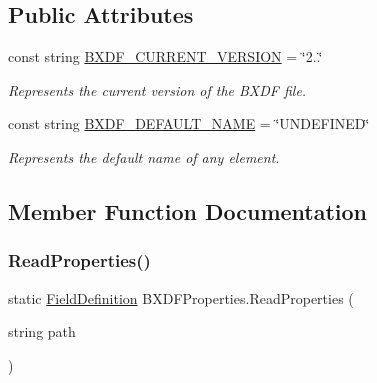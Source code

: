 \subsection*{Public Attributes}
\begin{DoxyCompactItemize}
\item 
const string \hyperlink{class_b_x_d_f_properties_a3a3fb8d9965ad93678223400a278fd47}{B\+X\+D\+F\+\_\+\+C\+U\+R\+R\+E\+N\+T\+\_\+\+V\+E\+R\+S\+I\+ON} = \char`\"{}2..\char`\"{}
\begin{DoxyCompactList}\small\item\em Represents the current version of the B\+X\+DF file. \end{DoxyCompactList}\item 
const string \hyperlink{class_b_x_d_f_properties_a528bb431080585f72f9f74bd44a23932}{B\+X\+D\+F\+\_\+\+D\+E\+F\+A\+U\+L\+T\+\_\+\+N\+A\+ME} = \char`\"{}U\+N\+D\+E\+F\+I\+N\+ED\char`\"{}
\begin{DoxyCompactList}\small\item\em Represents the default name of any element. \end{DoxyCompactList}\end{DoxyCompactItemize}


\subsection{Member Function Documentation}
\mbox{\label{class_b_x_d_f_properties_aaccec6c74c63d681230c9b08a1e8c4ea}} 
\subsubsection{\texorpdfstring{Read\+Properties()}{ReadProperties()}\hspace{0.1cm}{\footnotesize\ttfamily [1/2]}}
{\footnotesize\ttfamily static \hyperlink{class_field_definition}{Field\+Definition} B\+X\+D\+F\+Properties.\+Read\+Properties (\begin{DoxyParamCaption}\item[{string}]{path }\end{DoxyParamCaption})\hspace{0.3cm}{\ttfamily [static]}}



